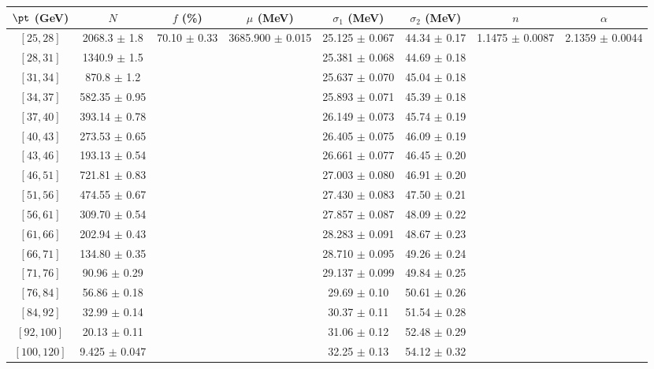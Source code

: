 \begin{tabular}{c||c|c|c|c|c|c|c}
$\pt$ (GeV) & $N$ & $f$ (\%) & $\mu$ (MeV) & $\sigma_1$ (MeV) & $\sigma_2$ (MeV) & $n$ & $\alpha$ \\
\hline
$[25, 28]$ & 2068.3 $\pm$ 1.8 & \multirow{17}{*}{70.10 $\pm$ 0.33} & \multirow{17}{*}{3685.900 $\pm$ 0.015} & 25.125 $\pm$ 0.067 & 44.34 $\pm$ 0.17 & \multirow{17}{*}{1.1475 $\pm$ 0.0087} & \multirow{17}{*}{2.1359 $\pm$ 0.0044}\\
$[28, 31]$ & 1340.9 $\pm$ 1.5 &  &  & 25.381 $\pm$ 0.068 & 44.69 $\pm$ 0.18 &  & \\
$[31, 34]$ & 870.8 $\pm$ 1.2 &  &  & 25.637 $\pm$ 0.070 & 45.04 $\pm$ 0.18 &  & \\
$[34, 37]$ & 582.35 $\pm$ 0.95 &  &  & 25.893 $\pm$ 0.071 & 45.39 $\pm$ 0.18 &  & \\
$[37, 40]$ & 393.14 $\pm$ 0.78 &  &  & 26.149 $\pm$ 0.073 & 45.74 $\pm$ 0.19 &  & \\
$[40, 43]$ & 273.53 $\pm$ 0.65 &  &  & 26.405 $\pm$ 0.075 & 46.09 $\pm$ 0.19 &  & \\
$[43, 46]$ & 193.13 $\pm$ 0.54 &  &  & 26.661 $\pm$ 0.077 & 46.45 $\pm$ 0.20 &  & \\
$[46, 51]$ & 721.81 $\pm$ 0.83 &  &  & 27.003 $\pm$ 0.080 & 46.91 $\pm$ 0.20 &  & \\
$[51, 56]$ & 474.55 $\pm$ 0.67 &  &  & 27.430 $\pm$ 0.083 & 47.50 $\pm$ 0.21 &  & \\
$[56, 61]$ & 309.70 $\pm$ 0.54 &  &  & 27.857 $\pm$ 0.087 & 48.09 $\pm$ 0.22 &  & \\
$[61, 66]$ & 202.94 $\pm$ 0.43 &  &  & 28.283 $\pm$ 0.091 & 48.67 $\pm$ 0.23 &  & \\
$[66, 71]$ & 134.80 $\pm$ 0.35 &  &  & 28.710 $\pm$ 0.095 & 49.26 $\pm$ 0.24 &  & \\
$[71, 76]$ & 90.96 $\pm$ 0.29 &  &  & 29.137 $\pm$ 0.099 & 49.84 $\pm$ 0.25 &  & \\
$[76, 84]$ & 56.86 $\pm$ 0.18 &  &  & 29.69 $\pm$ 0.10 & 50.61 $\pm$ 0.26 &  & \\
$[84, 92]$ & 32.99 $\pm$ 0.14 &  &  & 30.37 $\pm$ 0.11 & 51.54 $\pm$ 0.28 &  & \\
$[92, 100]$ & 20.13 $\pm$ 0.11 &  &  & 31.06 $\pm$ 0.12 & 52.48 $\pm$ 0.29 &  & \\
$[100, 120]$ & 9.425 $\pm$ 0.047 &  &  & 32.25 $\pm$ 0.13 & 54.12 $\pm$ 0.32 &  & \\
\end{tabular}
